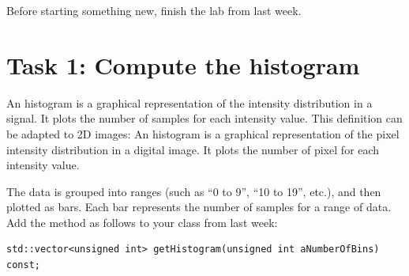 \documentclass[english,a4paper,12pt,oneside]{article}
\begin{document}
Before starting something new, finish the lab from last week. 

\section*{Task 1: Compute the histogram}

An histogram is a graphical representation of the intensity distribution in a signal.
It plots the number of samples for each intensity value. 
This definition can be adapted to 2D images:
An histogram is a graphical representation of the pixel intensity distribution in a digital image.
It plots the number of pixel for each intensity value. 

The data is grouped into ranges (such as ``0 to 9'', ``10 to 19'', etc.), and then plotted as bars. 
Each bar represents the number of samples for a range of data. 
Add the method as follows to your class from last week:\\

\begin{lstlisting}
std::vector<unsigned int> getHistogram(unsigned int aNumberOfBins) const;
\end{lstlisting}
\end{document}
